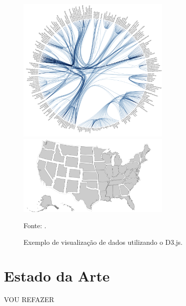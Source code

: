 \begin{figure}[H]
	\caption{Exemplo de visualização de dados utilizando o D3.js.}
	\begin{center}
		\includegraphics[width=7.5cm]{imagens/d3_1.png}%
		\hspace{1cm}%
		\includegraphics[width=7.5cm]{imagens/d3_2.PNG}%
	\end{center}
	\small{Fonte: \cite{d3js}.}
	\label{fig:d3}
\end{figure}

\section{Estado da Arte}


{\Huge VOU REFAZER}
